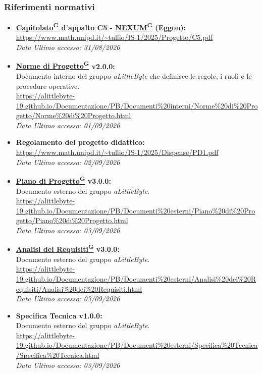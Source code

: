 \documentclass[a4paper,12pt]{article}
\providecommand{\glslink}[2]{\href{https://alittlebyte-19.github.io/Documentazione/glossario.html\#gls-#1}{\underline{#2}\textsuperscript{\scriptsize G}}}
\begin{document}
\subsubsection{Riferimenti normativi}
\begin{itemize}
    \item \textbf{\glslink{capitolato}{Capitolato} d'appalto C5 - \glslink{nexum}{NEXUM} (Eggon):}\\
    \url{https://www.math.unipd.it/~tullio/IS-1/2025/Progetto/C5.pdf} \\
    \textit{Data Ultimo accesso: 31/08/2026}

    \item \textbf{\glslink{norme-di-progetto}{Norme di Progetto} v2.0.0:}\\
    Documento interno del gruppo \textit{aLittleByte} che definisce le regole, i ruoli e le procedure operative.\\
    \url{https://alittlebyte-19.github.io/Documentazione/PB/Documenti%20interni/Norme%20di%20Progetto/Norme%20di%20Progetto.html}\\
    \textit{Data Ultimo accesso: 01/09/2026}

    \item \textbf{Regolamento del progetto didattico:}\\
    \url{https://www.math.unipd.it/~tullio/IS-1/2025/Dispense/PD1.pdf}\\
    \textit{Data Ultimo accesso: 02/09/2026}

    \item \textbf{\glslink{piano-di-progetto}{Piano di Progetto} v3.0.0:}\\
    Documento esterno del gruppo \textit{aLittleByte}.\\
    \url{https://alittlebyte-19.github.io/Documentazione/PB/Documenti%20esterni/Piano%20di%20Progetto/Piano%20di%20Progetto.html}\\
    \textit{Data Ultimo accesso: 03/09/2026}

    \item \textbf{\glslink{analisi-dei-requisiti-adr}{Analisi dei Requisiti} v3.0.0:}\\
    Documento esterno del gruppo \textit{aLittleByte}.\\
    \url{https://alittlebyte-19.github.io/Documentazione/PB/Documenti%20esterni/Analisi%20dei%20Requisiti/Analisi%20dei%20Requisiti.html}\\
    \textit{Data Ultimo accesso: 03/09/2026}

    \item \textbf{Specifica Tecnica v1.0.0:}\\
    Documento esterno del gruppo \textit{aLittleByte}.\\
    \url{https://alittlebyte-19.github.io/Documentazione/PB/Documenti%20esterni/Specifica%20Tecnica/Specifica%20Tecnica.html}\\
    \textit{Data Ultimo accesso: 03/09/2026}
\end{itemize}
\end{document}
